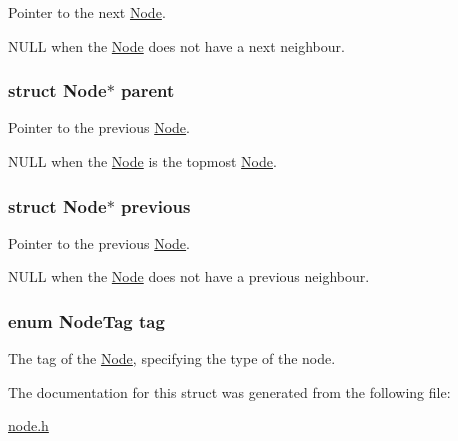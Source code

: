 Pointer to the next \hyperlink{structNode}{Node}. 

N\-U\-L\-L when the \hyperlink{structNode}{Node} does not have a next neighbour. \hypertarget{structNode_a7b739036012f282683e6452a0b1595af}{
\subsubsection[{parent}]{\setlength{\rightskip}{0pt plus 5cm}struct {\bf Node}$\ast$ parent}}\label{structNode_a7b739036012f282683e6452a0b1595af}


Pointer to the previous \hyperlink{structNode}{Node}. 

N\-U\-L\-L when the \hyperlink{structNode}{Node} is the topmost \hyperlink{structNode}{Node}. \hypertarget{structNode_a9a9311efc5dc64017bf492a386b77b0d}{
\subsubsection[{previous}]{\setlength{\rightskip}{0pt plus 5cm}struct {\bf Node}$\ast$ previous}}\label{structNode_a9a9311efc5dc64017bf492a386b77b0d}


Pointer to the previous \hyperlink{structNode}{Node}. 

N\-U\-L\-L when the \hyperlink{structNode}{Node} does not have a previous neighbour. \hypertarget{structNode_aae55c9a8e76121d7f9c721c0239e6fb8}{
\subsubsection[{tag}]{\setlength{\rightskip}{0pt plus 5cm}enum {\bf Node\-Tag} tag}}\label{structNode_aae55c9a8e76121d7f9c721c0239e6fb8}


The tag of the \hyperlink{structNode}{Node}, specifying the type of the node. 



The documentation for this struct was generated from the following file\-:\begin{DoxyCompactItemize}
\item 
\hyperlink{node_8h}{node.\-h}\end{DoxyCompactItemize}
